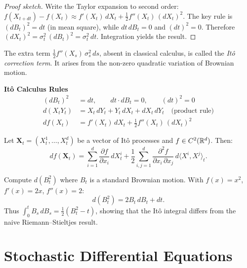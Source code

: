 \begin{proof}[Proof sketch]
Write the Taylor expansion to second order:
$f(X_{t+dt}) - f(X_t) \approx f'(X_t)\,dX_t + \frac{1}{2}f''(X_t)\,(dX_t)^2$.
The key rule is $(dB_t)^2 = dt$ (in mean square), while $dt\,dB_t = 0$
and $(dt)^2 = 0$. Therefore $(dX_t)^2 = \sigma_t^2\,(dB_t)^2 = \sigma_t^2\,dt$.
Integration yields the result.
\end{proof}

\begin{remark}
The extra term $\frac{1}{2}f''(X_s)\,\sigma_s^2\,ds$, absent in
classical calculus, is called the \emph{It\^o correction term}. It
arises from the non-zero quadratic variation of Brownian motion.
\end{remark}

\begin{keyformulas}
\textbf{It\^o Calculus Rules}
\begin{align*}
  (dB_t)^2 &= dt, \qquad dt\cdot dB_t = 0, \qquad (dt)^2 = 0 \\[4pt]
  d(X_t Y_t) &= X_t\,dY_t + Y_t\,dX_t + dX_t\,dY_t
    \quad \text{(product rule)} \\[4pt]
  df(X_t) &= f'(X_t)\,dX_t + \tfrac{1}{2}f''(X_t)\,(dX_t)^2
\end{align*}
\end{keyformulas}

\begin{corollary}
Let $\mathbf{X}_t = (X_t^1, \ldots, X_t^d)$ be a vector of It\^o
processes and $f \in C^2(\mathbb{R}^d)$. Then:
\[
  df(\mathbf{X}_t) = \sum_{i=1}^d \frac{\partial f}{\partial x_i}\,dX_t^i
    + \frac{1}{2}\sum_{i,j=1}^d \frac{\partial^2 f}{\partial x_i\,\partial x_j}
    \,d\langle X^i, X^j\rangle_t.
\]
\end{corollary}

\begin{example}
Compute $d(B_t^2)$ where $B_t$ is a standard Brownian motion.
With $f(x) = x^2$, $f'(x) = 2x$, $f''(x) = 2$:
\[
  d(B_t^2) = 2B_t\,dB_t + dt.
\]
Thus $\int_0^t B_s\,dB_s = \frac{1}{2}(B_t^2 - t)$, showing that the
It\^o integral differs from the naive Riemann--Stieltjes result.
\end{example}

\section{Stochastic Differential Equations}
\label{sec:sde}

